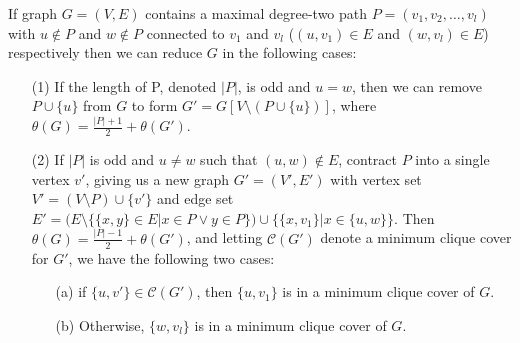 \documentclass[../techreport.tex]{subfiles}
\begin{document}
\begin{reduction} 
	If graph $G = (V, E)$ contains a maximal degree-two path $P = (v_1, v_2, \dots, v_l)$ with $u \notin P$ and $w \notin P$ connected to $v_1$ and $v_l$ ($(u, v_1) \in E$ and $(w, v_l) \in E$) respectively then we can reduce $G$ in the following cases:

\begin{itemize}
	\item[(1)] If the length of P, denoted $|P|$, is odd and $u = w$, then we can remove $P \cup \{u\}$ from $G$ to form $G' = G[V\setminus (P \cup \{u\})]$, where $\theta(G) = \frac{|P|+1}{2} + \theta(G')$.
	
	\item[(2)] If $|P|$ is odd and $u \neq w$ such that $(u, w) \notin E$, contract $P$ into a single vertex $v'$, giving us a new graph $G' = (V', E')$ with vertex set $V' = (V \setminus P) \cup \{v'\}$ and edge set $E' = (E \setminus \{\{x, y\} \in E | x \in P \lor y \in P\}) \cup \{\{x , v_1\}| x \in \{u, w\}\}$. Then $\theta(G) = \frac{|P| - 1}{2} + \theta(G')$, and letting $\mathcal{C}(G')$ denote a minimum clique cover for $G'$, we have the following two cases:
	\begin{itemize}
		\item[(a)] if $\{u, v'\} \in \mathcal{C}(G')$, then $\{u, v_1\}$ is in a minimum clique cover of $G$.

		\item[(b)] Otherwise, $\{w, v_l\}$ is in a minimum clique cover of $G$.
	\end{itemize}
\end{itemize}
\end{reduction}
\end{document}
